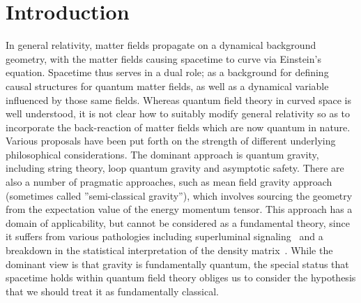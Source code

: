 \documentclass[aps,preprintnumbers,superscriptaddress,longbibliography]{revtex4-1}
\begin{document}
\maketitle 






\section{Introduction}
In general relativity, matter fields propagate on a dynamical background geometry, with the matter fields causing spacetime to curve via Einstein's equation. Spacetime thus serves in a dual role; as a background for defining causal structures for quantum matter fields, as well as a dynamical variable influenced by those same fields. Whereas quantum field theory in curved space is well understood, it is not clear how to suitably modify general relativity so as to incorporate the back-reaction of matter fields which are now quantum in nature. Various proposals have been put forth on the strength of different underlying philosophical considerations. The dominant approach is quantum gravity, including string theory, loop quantum gravity and asymptotic safety.  There are also a number of pragmatic approaches, 
such as mean field gravity approach (sometimes called ''semi-classical gravity''), which involves sourcing the geometry from the expectation value of the energy momentum tensor. This approach has a domain of applicability, but cannot be considered  as a fundamental theory, since it suffers from various pathologies including superluminal signaling~\cite{gisin1989stochastic} and a breakdown in the statistical interpretation of the density matrix~\cite{page1981indirect}.
While the dominant view is that gravity is fundamentally quantum, the special status that spacetime holds within quantum field theory obliges us to consider the hypothesis that we should treat it as fundamentally classical.
\end{document}
